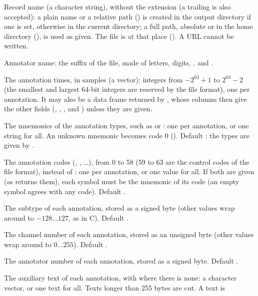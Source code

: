 \begin{params}
\item[record] Record name (a character string), without the  extension (a
  trailing  is also accepted): a plain name or a relative path
  () is created in the output directory if one is set, otherwise in the
  current directory; a full path, absolute or in the home directory
  (), is used as given. The file is  at
  that place (). A URL cannot be written.
\item[annotator] Annotator name: the suffix of the file, made of letters, digits,
  \code{\_}, \code{-} and \code{\textasciitilde}.
\item[sample] The annotation times, in samples (a vector): integers from $-2^{63}+1$ to
  $2^{63}-2$ (the smallest and largest 64-bit integers are reserved by the file format),
  one per annotation. It may also be a data frame returned by
  , whose columns then give the other fields (,
  , ,  and ) unless they are given.
\item[symbol] The mnemonics of the annotation types, such as  or :
  one per annotation, or one string for all. An unknown mnemonic becomes code 0
  (). Default : the types are given by .
\item[code] The annotation codes (, , \ldots), from 0 to 58 (59 to
  63 are the control codes of the file format), instead of : one per
  annotation, or one value for all. If both are given (as
   returns them), each symbol must be the mnemonic of its code (an
  empty symbol agrees with any code). Default .
\item[subtype] The subtype of each annotation, stored as a signed byte (other values wrap
  around to $-128 \ldots 127$, as in C). Default .
\item[chan] The channel number of each annotation, stored as an unsigned byte (other
  values wrap around to $0 \ldots 255$). Default .
\item[num] The annotator number of each annotation, stored as a signed byte. Default
  .
\item[aux] The auxiliary text of each annotation, with  where there is none: a
  character vector, or one text for all. Texts longer than 255 bytes are cut. A text is

\end{params}
